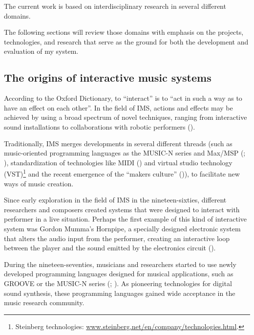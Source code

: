 \documentclass[a4paper,11pt]{article}
\begin{document}
The current work is based on interdisciplinary research in several different domains.


The following sections will review those domains with emphasis on the projects, technologies, and research that serve as the ground for both the development and evaluation of my system.

\subsection{The origins of interactive music systems}

According to the Oxford Dictionary, to ``interact'' is to ``act in such a way as to have an effect on each other''.
In the field of IMS, actions and effects may be achieved by using a broad spectrum of novel techniques, ranging from interactive sound installations to collaborations with robotic performers (\cite{drummond09}).

Traditionally, IMS merges developments in several different threads (such as music-oriented programming languages as the MUSIC-N series and Max/MSP (\cite{mathews69}; \cite[p. 16]{winkler01}), standardization of technologies like MIDI (\cite{web:quinn}) and virtual studio technology (VST)\footnote{Steinberg technologies: \href{http://www.steinberg.net/en/company/technologies.html}{www.steinberg.net/en/company/technologies.html}.} and the recent emergence of the ``makers culture'' (\cite{kuznetsov2010rise})), to facilitate new ways of music creation.

Since early exploration in the field of IMS in the nineteen-sixties, different researchers and composers created systems that were designed to interact with performer in a live situation.
Perhaps the first example of this kind of interactive system was Gordon Mumma's Hornpipe, a specially designed electronic system that alters the audio input from the performer, creating an interactive loop between the player and the sound emitted by the electronics circuit (\cite[p. 12]{winkler01}).

During the nineteen-seventies, musicians and researchers started to use newly developed programming languages designed for musical applications, such as GROOVE or the MUSIC-N series (\cite{mathews70}; \cite{mathews69}).
As pioneering technologies for digital sound synthesis, these programming languages gained wide acceptance in the music research community.
\end{document}
